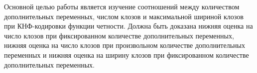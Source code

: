 
Основной целью работы является изучение соотношений между количеством дополнительных переменных, числом клозов и максимальной шириной клозов при КНФ-кодировки функции четности. Должна быть доказана нижняя оценка на число клозов при фиксированном количестве дополнительных переменных, нижняя оценка на число клозов при произвольном количестве дополнительных переменных и нижняя оценка на ширину клозов при фиксированном количестве дополнительных переменных. 